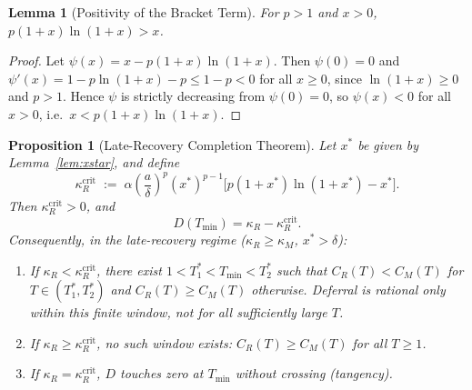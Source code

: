 \documentclass[11pt]{article}
\newtheorem{proposition}[definition]{Proposition}
\newtheorem{lemma}[definition]{Lemma}
\begin{document}
\begin{lemma}[Positivity of the Bracket Term]
\label{lem:psi}
For $p>1$ and $x>0$, $p(1+x)\ln(1+x) > x$.
\end{lemma}

\begin{proof}
Let $\psi(x) = x - p(1+x)\ln(1+x)$. Then $\psi(0)=0$ and $\psi'(x) = 1 - p\ln(1+x) - p \leq 1-p < 0$ for all $x\geq0$, since $\ln(1+x)\geq0$ and $p>1$. Hence $\psi$ is strictly decreasing from $\psi(0)=0$, so $\psi(x)<0$ for all $x>0$, i.e.\ $x < p(1+x)\ln(1+x)$.
\end{proof}

\begin{proposition}[Late-Recovery Completion Theorem]
\label{prop:completion}
Let $x^*$ be given by Lemma~\ref{lem:xstar}, and define
\[
\kappa_R^{\mathrm{crit}} \;:=\; \alpha\left(\frac{a}{\delta}\right)^p (x^*)^{p-1}\Big[p(1+x^*)\ln(1+x^*) - x^*\Big].
\]
Then $\kappa_R^{\mathrm{crit}} > 0$, and
\[
D(T_{\min}) = \kappa_R - \kappa_R^{\mathrm{crit}}.
\]
Consequently, in the late-recovery regime ($\kappa_R\geq\kappa_M$, $x^*>\delta$):
\begin{enumerate}[label=(\roman*)]
\item If $\kappa_R < \kappa_R^{\mathrm{crit}}$, there exist $1 < T_1^* < T_{\min} < T_2^*$ such that $C_R(T) < C_M(T)$ for $T\in(T_1^*,T_2^*)$ and $C_R(T)\geq C_M(T)$ otherwise. Deferral is rational only within this finite window, not for all sufficiently large $T$.
\item If $\kappa_R \geq \kappa_R^{\mathrm{crit}}$, no such window exists: $C_R(T)\geq C_M(T)$ for all $T\geq 1$.
\item If $\kappa_R = \kappa_R^{\mathrm{crit}}$, $D$ touches zero at $T_{\min}$ without crossing (tangency).
\end{enumerate}
\end{proposition}
\end{document}
